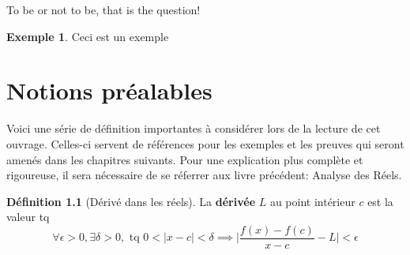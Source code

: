 \documentclass[12pt]{report}
\theoremstyle{definition}
\newtheorem{definition}{Définition}[section]
\newtheorem*{example}{Exemple}
\begin{document}
    \begin{attention}
        To be or not to be, that is the question!
    \end{attention}


    \begin{example}
        Ceci est un exemple
    \end{example}

\appendix
\chapter{Notions préalables}
    Voici une série de définition importantes à considérer lors de la lecture de cet ouvrage. Celles-ci servent
    de références pour les exemples et les preuves qui seront amenés dans les chapitres suivants. Pour une explication
    plus complète et rigoureuse, il sera nécessaire de se réferrer aux livre précédent: Analyse des Réels.

    \begin{definition}[Dérivé dans les réels]
        \label{def:derive_reels}
        La \textbf{dérivée} $L$ au point intérieur $c$ est la valeur tq 
        $$ \forall \epsilon > 0, \exists \delta > 0, \text{ tq } 0 < |x - c| < \delta \implies \big| \frac{f(x) - f(c)}{x - c} - L \big| < \epsilon $$
    \end{definition}
\end{document}
